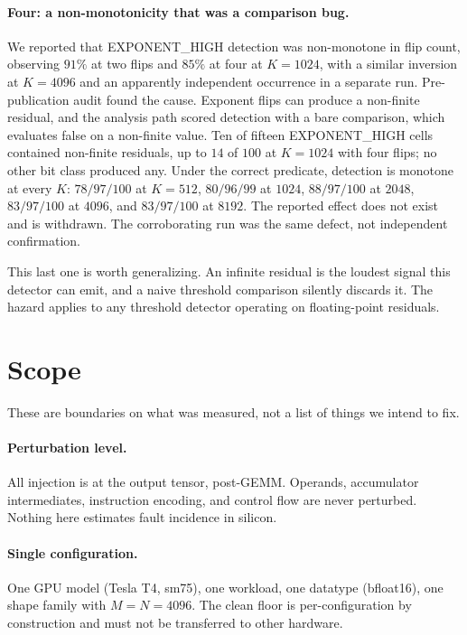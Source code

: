 \documentclass[11pt]{article}
\begin{document}
\paragraph{Four: a non-monotonicity that was a comparison bug.}
We reported that EXPONENT\_HIGH detection was non-monotone in flip count,
observing $91\%$ at two flips and $85\%$ at four at $K = 1024$, with a similar
inversion at $K = 4096$ and an apparently independent occurrence in a separate
run. Pre-publication audit found the cause. Exponent flips can produce a
non-finite residual, and the analysis path scored detection with a bare
comparison, which evaluates false on a non-finite value. Ten of fifteen
EXPONENT\_HIGH cells contained non-finite residuals, up to $14$ of $100$ at
$K = 1024$ with four flips; no other bit class produced any. Under the correct
predicate, detection is monotone at every $K$: $78/97/100$ at $K = 512$,
$80/96/99$ at $1024$, $88/97/100$ at $2048$, $83/97/100$ at $4096$, and
$83/97/100$ at $8192$. The reported effect does not exist and is withdrawn.
The corroborating run was the same defect, not independent confirmation.

This last one is worth generalizing. An infinite residual is the loudest signal
this detector can emit, and a naive threshold comparison silently discards it.
The hazard applies to any threshold detector operating on floating-point
residuals.

\section{Scope}
\label{sec:scope}

These are boundaries on what was measured, not a list of things we intend to
fix.

\paragraph{Perturbation level.}
All injection is at the output tensor, post-GEMM. Operands, accumulator
intermediates, instruction encoding, and control flow are never perturbed.
Nothing here estimates fault incidence in silicon.

\paragraph{Single configuration.}
One GPU model (Tesla T4, sm75), one workload, one datatype (bfloat16), one
shape family with $M = N = 4096$. The clean floor is per-configuration by
construction and must not be transferred to other hardware.
\end{document}
